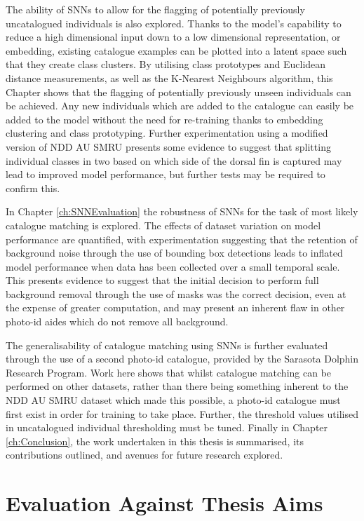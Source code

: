 The ability of SNNs to allow for the flagging of potentially previously uncatalogued individuals is also explored. Thanks to the model's capability to reduce a high dimensional input down to a low dimensional representation, or embedding, existing catalogue examples can be plotted into a latent space such that they create class clusters. By utilising class prototypes and Euclidean distance measurements, as well as the K-Nearest Neighbours algorithm, this Chapter shows that the flagging of potentially previously unseen individuals can be achieved. Any new individuals which are added to the catalogue can easily be added to the model without the need for re-training thanks to embedding clustering and class prototyping. Further experimentation using a modified version of NDD AU SMRU presents some evidence to suggest that splitting individual classes in two based on which side of the dorsal fin is captured may lead to improved model performance, but further tests may be required to confirm this. 

In Chapter \ref{ch:SNNEvaluation} the robustness of SNNs for the task of most likely catalogue matching is explored. The effects of dataset variation on model performance are quantified, with experimentation suggesting that the retention of background noise through the use of bounding box detections leads to inflated model performance when data has been collected over a small temporal scale. This presents evidence to suggest that the initial decision to perform full background removal through the use of masks was the correct decision, even at the expense of greater computation, and may present an inherent flaw in other photo-id aides which do not remove all background. 

The generalisability of catalogue matching using SNNs is further evaluated through the use of a second photo-id catalogue, provided by the Sarasota Dolphin Research Program. Work here shows that whilst catalogue matching can be performed on other datasets, rather than there being something inherent to the NDD AU SMRU dataset which made this possible, a photo-id catalogue must first exist in order for training to take place. Further, the threshold values utilised in uncatalogued individual thresholding must be tuned. Finally in Chapter \ref{ch:Conclusion}, the work undertaken in this thesis is summarised, its contributions outlined, and avenues for future research explored. 

\section{Evaluation Against Thesis Aims}\label{ch:Conclusion,sec:AimsEvaluation}

